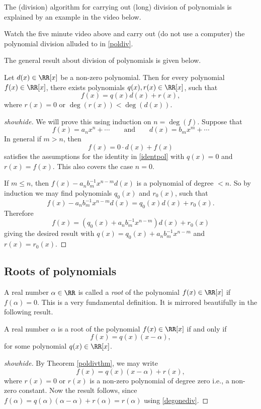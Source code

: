 \documentclass{article}
\begin{document}
The (division) algorithm for carrying out (long) division of
polynomials is explained by an example in the video below.

\begin{video}
\end{video}

\beginshex
Watch the five minute video above and
carry out (do not use a computer) the polynomial division alluded to in \eqref{poldiv}.
\endshex

The general result about division of polynomials is given below.

\begin{theorem}[emph]\label{poldivthm}
Let $d(x)\in \RR[x]$ be a non-zero polynomial. Then 
for every polynomial $f(x)\in \RR[x]$, there exists
polynomials $q(x), r(x)\in \RR[x]$, such that
\begin{equation}\label{identpol}
f(x) = q(x) d(x) + r(x),
\end{equation}
where $r(x) = 0$ or $\deg(r(x)) < \deg(d(x))$.
\end{theorem}
\begin{proof}[showhide]
We will prove this using induction on $n = \deg(f)$. Suppose that
$$
f(x) = a_n x^n + \cdots\qquad\text{and}\qquad d(x) = b_m x^m + \cdots
$$
In general if $m > n$, then
$$
f(x) = 0\cdot d(x) + f(x)
$$
satisfies the assumptions for the identity in \eqref{identpol} with
$ q(x) = 0$ and $r(x) = f(x)$. This also covers the case $n=0$.

If $m\leq n$, then $f(x) - a_n b_m^{-1} x^{n-m} d(x)$ is a polynomial of
degree $<n$. So by induction we may find polynomials $q_0(x)$ and $r_0(x)$, such that
$$
f(x) - a_n b_m^{-1} x^{n-m} d(x) = q_0(x) d(x) + r_0(x).
$$
Therefore
$$
f(x) = (q_0(x) + a_n b_m^{-1} x^{n-m})d(x) + r_0(x)
$$
giving the desired result with $q(x) = q_0(x) + a_n b_m^{-1} x^{n-m}$ and $r(x) = r_0(x)$. 
\end{proof}


\subsection{Roots of polynomials}

A real number $\alpha\in \RR$ is called a \emph{root} of the polynomial $f(x)\in \RR[x]$ if
$f(\alpha) = 0$. This is a very fundamental definition. It is mirrored beautifully in the following
result.

\begin{proposition}\label{proproot}
A real number $\alpha$ is a root of the polynomial $f(x)\in \RR[x]$ if and only if
$$
f(x) = q(x) (x-\alpha),
$$
for some polynomial $q(x)\in \RR[x]$.
\end{proposition}
\begin{proof}[showhide]
By Theorem \ref{poldivthm}, we may write
\begin{equation}\label{degonediv}
f(x) = q(x)(x-\alpha) + r(x),
\end{equation}
where $r(x)= 0$ or $r(x)$ is a non-zero polynomial of degree zero i.e., a  non-zero
constant. Now the result follows, since $f(\alpha) = q(\alpha)(\alpha - \alpha) + r(\alpha) = r(\alpha)$ 
using \eqref{degonediv}.
\end{proof}
\end{document}
